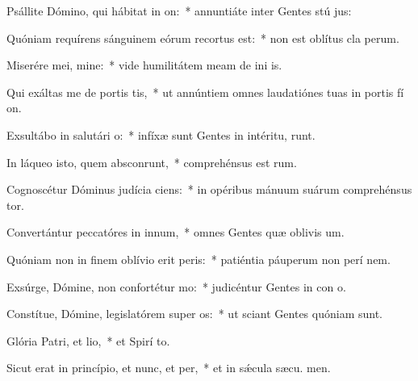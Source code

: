 \item Psállite Dómino, qui hábitat in on:~* annuntiáte inter Gentes stú jus:
\item Quóniam requírens sánguinem eórum recortus est:~* non est oblítus cla perum.
\item Miserére mei, mine:~* vide humilitátem meam de ini is.
\item Qui exáltas me de portis tis,~* ut annúntiem omnes laudatiónes tuas in portis fí on.
\item Exsultábo in salutári o:~* infíxæ sunt Gentes in intéritu,  runt.
\item In láqueo isto, quem absconrunt,~* comprehénsus est  rum.
\item Cognoscétur Dóminus judícia ciens:~* in opéribus mánuum suárum comprehénsus  tor.
\item Convertántur peccatóres in innum,~* omnes Gentes quæ oblivis um.
\item Quóniam non in finem oblívio erit peris:~* patiéntia páuperum non perí  nem.
\item Exsúrge, Dómine, non confortétur mo:~* judicéntur Gentes in con o.
\item Constítue, Dómine, legislatórem super os:~* ut sciant Gentes quóniam  sunt.
\item Glória Patri, et lio,~* et Spirí to.
\item Sicut erat in princípio, et nunc, et per,~* et in sǽcula sæcu. men.
